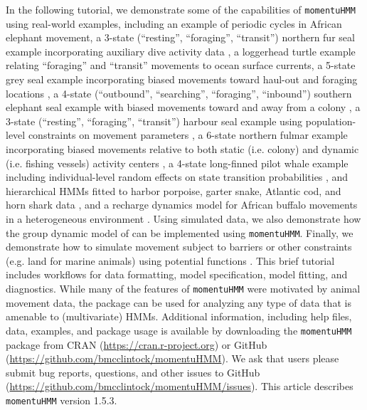 \documentclass[12pt]{article}\usepackage[]{graphicx}\usepackage[]{color}
\begin{document}
In the following tutorial, we demonstrate some of the capabilities of \verb|momentuHMM| using real-world examples, including an example of periodic cycles in African elephant movement, a 3-state (``resting'', ``foraging'', ``transit'') northern fur seal example incorporating auxiliary dive activity data \citep{McClintockEtAl2014b}, a loggerhead turtle example relating ``foraging'' and ``transit'' movements to ocean surface currents, a 5-state grey seal example incorporating biased movements toward haul-out and foraging locations \citep{McClintockEtAl2012}, a 4-state (``outbound'', ``searching'', ``foraging'', ``inbound'') southern elephant seal example with biased movements toward and away from a colony \citep{MichelotEtAl2017}, a 3-state (``resting'', ``foraging'', ``transit'') harbour seal example using population-level constraints on movement parameters \citep{McClintockEtAl2013c}, a 6-state northern fulmar example incorporating biased movements relative to both static (i.e. colony) and dynamic (i.e. fishing vessels) activity centers \citep{PirottaEtAl2018}, a 4-state long-finned pilot whale example including individual-level random effects on state transition probabilities \citep{IsojunnoEtAl2017}, and hierarchical HMMs fitted to harbor porpoise, garter snake, Atlantic cod, and horn shark data \citep{Leos-BarajasEtAl2017,AdamEtAl2019}, and a recharge dynamics model for African buffalo movements in a heterogeneous environment \citep{HootenEtAl2019}. Using simulated data, we also demonstrate how the group dynamic model of \cite{LangrockEtAl2014} can be implemented using \verb|momentuHMM|. Finally, we demonstrate how to simulate movement subject to barriers or other constraints (e.g. land for marine animals) using potential functions \citep[e.g.][]{BrillingerEtAl2012}. This brief tutorial includes workflows for data formatting, model specification, model fitting, and diagnostics. While many of the features of \verb|momentuHMM| were motivated by animal movement data, the package can be used for analyzing any type of data that is amenable to (multivariate) HMMs.  Additional information, including help files, data, examples, and package usage is available by downloading the \verb|momentuHMM| package from CRAN (\url{https://cran.r-project.org}) or GitHub (\url{https://github.com/bmcclintock/momentuHMM}). We ask that users please submit bug reports, questions, and other issues to GitHub (\url{https://github.com/bmcclintock/momentuHMM/issues}). This article describes \verb|momentuHMM| version 1.5.3.
\end{document}
